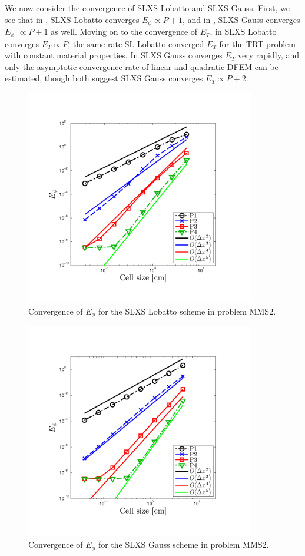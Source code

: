 We now consider the convergence of SLXS Lobatto and SLXS Gauss.  
First, we see that in , SLXS Lobatto converges $E_{\phi} \propto P+1$, and in , SLXS Gauss converges $E_{\phi}$ $\propto P+1$ as well.
Moving on to the convergence of $E_T$, in  SLXS Lobatto converges $E_T \propto P$, the same rate SL Lobatto converged $E_T$ for the TRT problem with constant material properties.  
In  SLXS Gauss converges $E_T$ very rapidly, and only the asymptotic convergence rate of linear and quadratic DFEM can be estimated, though both suggest SLXS Gauss converges $E_T \propto P+2$.
\begin{figure}[!hbp]
\centering
\includegraphics[width=10cm,trim=0.25in  0.25in 0.75in 0.75in,clip=true]{chapter6_grey_radtran/Dissertation_Data/MMS3_SLXS_Lobatto_phi_L2.pdf}
\caption{Convergence of $E_{\phi}$ for the SLXS Lobatto scheme in problem MMS2.}
\label{fig:mms3_slxs_lobatto_e_phi}
\end{figure}
%
%
\begin{figure}[!htp]
\centering
\includegraphics[width=10cm,trim=0.25in  0.25in 0.75in 0.75in,clip=true]{chapter6_grey_radtran/Dissertation_Data/MMS3_SLXS_Gauss_phi_L2.pdf}
\caption{Convergence of $E_{\phi}$ for the SLXS Gauss scheme in problem MMS2.}
\label{fig:mms3_slxs_gauss_e_phi}
\end{figure}
